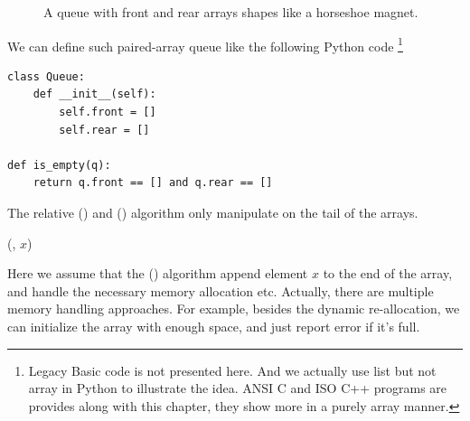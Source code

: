 \documentclass{article}
\begin{document}
\begin{figure}[htbp]
  \centering
  \caption{A queue with front and rear arrays shapes like a horseshoe magnet.} \label{fig:horseshoe-array}
\end{figure}

We can define such paired-array queue like the following Python code \footnote{Legacy Basic
code is not presented here. And we actually use list but not array in Python to illustrate the idea.
ANSI C and ISO C++ programs are provides along with this chapter, they show more
in a purely array manner.}

\lstset{language=Python}
\begin{lstlisting}
class Queue:
    def __init__(self):
        self.front = []
        self.rear = []

def is_empty(q):
    return q.front == [] and q.rear == []
\end{lstlisting}

The relative () and () algorithm only manipulate
on the tail of the arrays.

\begin{algorithmic}
  \State {}(, $x$)
\EndFunction
\end{algorithmic}

Here we assume that the () algorithm append element $x$ to
the end of the array, and handle the necessary memory allocation etc. Actually,
there are multiple memory handling approaches. For example, besides the
dynamic re-allocation, we can initialize the array with enough space, and just
report error if it's full.
\end{document}
